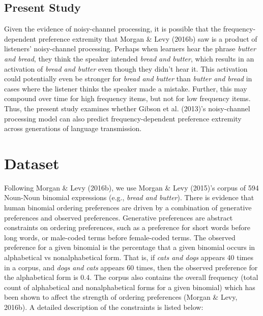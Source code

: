 \documentclass[10pt, letterpaper, hidelinks]{article}
\begin{document}
\hypertarget{present-study}{%
\subsection{Present Study}\label{present-study}}

Given the evidence of noisy-channel processing, it is possible that the
frequency-dependent preference extremity that Morgan \& Levy (2016b) saw
is a product of listeners' noisy-channel processing. Perhaps when
learners hear the phrase \emph{butter and bread}, they think the speaker
intended \emph{bread and butter}, which results in an activation of
\emph{bread and butter} even though they didn't hear it. This activation
could potentially even be stronger for \emph{bread and butter} than
\emph{butter and bread} in cases where the listener thinks the speaker
made a mistake. Further, this may compound over time for high frequency
items, but not for low frequency items. Thus, the present study examines
whether Gibson et al. (2013)'s noisy-channel processing model can also
predict frequency-dependent preference extremity across generations of
language transmission.

\hypertarget{dataset}{%
\section{Dataset}\label{dataset}}

Following Morgan \& Levy (2016b), we use Morgan \& Levy (2015)'s corpus
of 594 Noun-Noun binomial expressions (e.g., \emph{bread and butter}).
There is evidence that human binomial ordering preferences are driven by
a combination of generative preferences and observed preferences.
Generative preferences are abstract constraints on ordering preferences,
such as a preference for short words before long words, or male-coded
terms before female-coded terms. The observed preference for a given
binomial is the percentage that a given binomial occurs in alphabetical
vs nonalphabetical form. That is, if \emph{cats and dogs} appears 40
times in a corpus, and \emph{dogs and cats} appears 60 times, then the
observed preference for the alphabetical form is 0.4. The corpus also
contains the overall frequency (total count of alphabetical and
nonalphabetical forms for a given binomial) which has been shown to
affect the strength of ordering preferences (Morgan \& Levy, 2016b). A
detailed description of the constraints is listed below:
\end{document}
